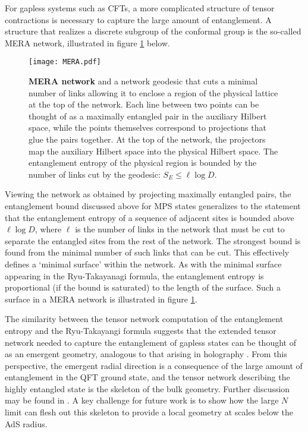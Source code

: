 \documentclass[10pt, oneside]{book}
\begin{document}
\begin{doublespace}
For gapless systems such as CFTs, a more complicated structure of tensor contractions is necessary to capture the large amount of entanglement. A structure that realizes a discrete subgroup of the conformal group is the so-called MERA network, illustrated in figure \ref{fig:MERA} below.
\begin{figure}[h]
\centering
\texttt{[image: MERA.pdf]}
\caption{\label{fig:MERA} {\bf MERA network} and a network geodesic that cuts a minimal number of links allowing it to enclose a region of the physical lattice at the top of the network. Each line between two points can be thought of as a maximally entangled pair in the auxiliary Hilbert space, while the points themselves correspond to projections that glue the pairs together. At the top of the network, the projectors map the auxiliary Hilbert space into the physical Hilbert space. The entanglement entropy of the physical region is bounded by the number of links cut by the geodesic: $S_E \leq \ell \log D$.}
\end{figure}
Viewing the network as obtained by projecting maximally entangled pairs, the entanglement bound discussed above for MPS states generalizes to the statement that the entanglement entropy of a sequence of adjacent sites is bounded above $\ell \log D$, where $\ell$ is the number of links in the network that must be cut to separate the entangled sites from the rest of the network. The strongest bound is found from the minimal number of such links that can be cut. This effectively defines a `minimal surface' within the network. As with the minimal surface appearing in the Ryu-Takayanagi formula, the entanglement entropy is proportional (if the bound is saturated) to the length of the surface. Such a surface in a MERA network is illustrated in figure \ref{fig:MERA}.

The similarity between the tensor network computation of the entanglement entropy and the Ryu-Takayangi formula suggests that the extended tensor network needed to capture the entanglement of gapless states can be thought of as an emergent geometry, analogous to that arising in holography \cite{Swingle:2009bg}. From this perspective, the emergent radial direction is a consequence of the large amount of entanglement in the QFT ground state, and the tensor network describing the highly entangled state is the skeleton of the bulk geometry.  Further discussion may be found in \cite{Swingle:2009bg, Swingle:2012wq, Pastawski:2015qua}. A key challenge for future work is to show how the large $N$ limit can flesh out this skeleton to provide a local geometry at scales below the AdS radius.


\end{doublespace}
\end{document}
